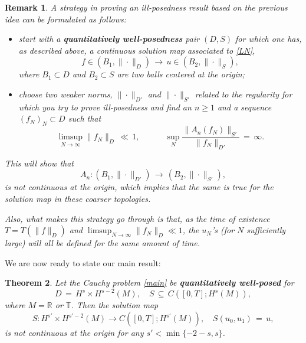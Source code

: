 \documentclass{amsart}
\newtheorem{theorem}{Theorem}[section]
\newtheorem{remark}[theorem]{Remark}
\begin{document}
\begin{remark}
A strategy in proving an ill-posedness result based on the previous idea can be formulated as follows:
\begin{itemize}
\item start with a \textbf{quantitatively well-posedness} pair $(D,S)$ for which one has, as described above, a continuous solution map associated to \eqref{LN},
\begin{equation}
f\in (B_1,\|\cdot \|_D)\,\longrightarrow\,u\in (B_2,\|\cdot \|_S),
\end{equation} 
where $B_1\subset D$ and $B_2 \subset S$ are two balls centered at the origin;

\item choose two weaker norms, $\| \cdot\|_{D'}$ and $\| \cdot\|_{S'}$ related to the regularity for which you try to prove ill-posedness and find an $n\geq 1$ and a sequence $(f_N)_N\subset D$ such that
\begin{equation}
\limsup_{N\to \infty} \|f_N\|_D\,\ll\,1, \qquad \quad \sup_N \frac{\|A_n(f_N)\|_{S'}}{\|f_N\|_{D'}}\,=\,\infty.
\label{ip}
\end{equation}
\end{itemize}  
This will show that 
\begin{equation}
A_n: (B_1,\|\cdot \|_{D'})\,\longrightarrow\,(B_2,\| \cdot\|_{S'}),
\end{equation} 
is not continuous at the origin, which implies that the same is true for the solution map in these coarser  topologies.

Also, what makes this strategy go through is that, as the time of existence $T=T(\|f\|_D)$ and $\limsup_{N\to \infty} \|f_N\|_D \ll 1$, the $u_N$'s (for $N$ sufficiently large) will all be defined for the same amount of time.
\label{ipr}
\end{remark}

We are now ready to state our main result:

\begin{theorem}
Let the Cauchy problem \eqref{main} be \textbf{quantitatively well-posed} for
\[
D\,=\,H^s \times H^{s-2}(M), \quad S\,\subseteq \,C([0,T]; H^s(M)), \]
where  $M=\mathbb{R}$ or $\mathbb{T}$. Then the solution map
\begin{equation}
S: H^{s'} \times H^{s'-2}(M) \to C([0,T]; H^{s'}(M)), \quad
S(u_0,u_1)\,=\,u,
\label{solmap}
\end{equation}
is not continuous at the origin for any $s'< \min\{-2-s, s\}$.
\label{mainth}
\end{theorem}
\end{document}
